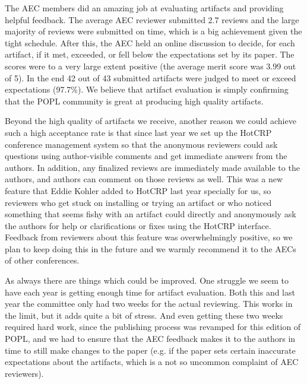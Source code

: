 
%
The AEC members did an amazing job at evaluating artifacts and
providing helpful feedback.
%
The average AEC reviewer submitted 2.7 reviews and the large majority
of reviews were submitted on time, which is a big achievement given
the tight schedule.
%
After this, the AEC held an online discussion to decide, for each
artifact, if it met, exceeded, or fell below the expectations set by
its paper.
%
The scores were to a very large extent positive (the average merit
score was 3.99 out of 5).
%
In the end 42 out of 43 submitted artifacts were judged to meet or
exceed expectations (97.7\%).
%
We believe that artifact evaluation is simply confirming that the POPL
community is great at producing high quality artifacts.

Beyond the high quality of artifacts we receive, another reason we could
achieve such a high acceptance rate is that since last year we set up
the HotCRP conference management system so that the anonymous
reviewers could ask questions using author-visible comments and get
immediate answers from the authors. In addition, any finalized reviews
are immediately made available to the authors, and authors can comment
on those reviews as well. This was a new feature that Eddie Kohler
added to HotCRP last year specially for us, so reviewers who get stuck
on installing or trying an artifact or who noticed something that
seems fishy with an artifact could directly and anonymously ask the
authors for help or clarifications or fixes using the HotCRP
interface. Feedback from reviewers about this feature was
overwhelmingly positive, so we plan to keep doing this in the
future and we warmly recommend it to the AECs of other conferences.

As always there are things which could be improved. One struggle we
seem to have each year is getting enough time for artifact
evaluation. Both this and last year the committee only had two weeks
for the actual reviewing. This works in the limit, but it adds quite a
bit of stress. And even getting these two weeks required hard work,
since the publishing process was revamped for this edition of POPL,
and we had to ensure that the AEC feedback makes it to the authors in
time to still make changes to the paper (e.g. if the paper sets
certain inaccurate expectations about the artifacts, which is a not so
uncommon complaint of AEC reviewers).

